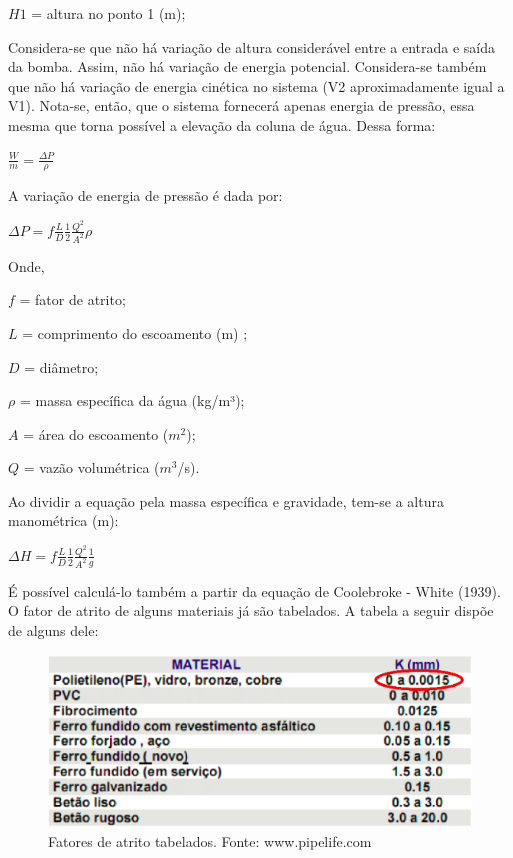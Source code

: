 $H1$ = altura no ponto 1 (m);

Considera-se que não há variação de altura considerável entre a entrada e saída da bomba. Assim, não há variação de energia potencial. Considera-se também que não há variação de energia cinética no sistema (V2 aproximadamente igual a V1). Nota-se, então, que o sistema fornecerá apenas energia de pressão, essa mesma que torna possível a elevação da coluna de água. Dessa forma:

\begin{center}
	\large
	${\displaystyle \frac{W}{m} = \frac{\Delta P}{\rho}}$
\end{center}

A variação de energia de pressão é dada por: 

\begin{center}
	\large
	${\displaystyle \Delta P = f \frac{L}{D} \frac{1}{2} \frac{Q^2}{A^2} \rho}$
\end{center}

Onde,

$f$ = fator de atrito;

$L$ = comprimento do escoamento (m) ;

$D$ = diâmetro;

$\rho$ = massa específica da água (kg/m³);

$A$ = área do escoamento ($m^2$);

$Q$ = vazão volumétrica ($m^3$/s).

Ao dividir a equação pela massa específica e gravidade, tem-se a altura manométrica (m):

\begin{center}
	\large
	${\displaystyle \Delta H = f \frac{L}{D} \frac{1}{2} \frac{Q^2}{A^2} \frac{1}{g}}$
\end{center}

É possível calculá-lo também a partir da equação de Coolebroke - White (1939). O fator de atrito de alguns materiais já são tabelados. A tabela a seguir dispõe de alguns dele:

\begin{figure}[H]
	\centering
	\includegraphics[width=13cm]{figuras/fatores_atrito.png}
	\caption{Fatores de atrito tabelados. Fonte: www.pipelife.com}
	\label{fatores_atrito}
\end{figure}

